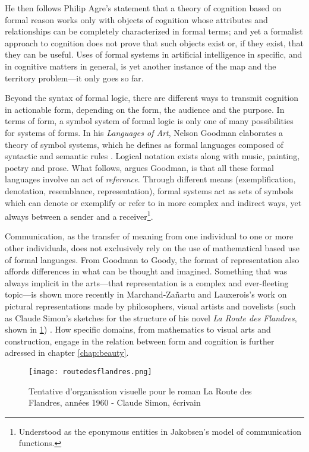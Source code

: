 He then follows Philip Agre's statement that a theory of cognition based on formal reason works only with objects of cognition whose attributes and relationships can be completely characterized in formal terms; and yet a formalist approach to cognition does not prove that such objects exist or, if they exist, that they can be useful. Uses of formal systems in artificial intelligence in specific, and in cognitive matters in general, is yet another instance of the map and the territory problem—it only goes so far.

Beyond the syntax of formal logic, there are different ways to transmit cognition in actionable form, depending on the form, the audience and the purpose. In terms of form, a symbol system of formal logic is only one of many possibilities for systems of forms. In his \emph{Languages of Art}, Nelson Goodman elaborates a theory of symbol systems, which he defines as formal languages composed of syntactic and semantic rules \citep{goodman_languages_1976}. Logical notation exists along with music, painting, poetry and prose. What follows, argues Goodman, is that all these formal languages involve an act of \emph{reference}. Through different means (exemplification, denotation, resemblance, representation), formal systems act as sets of symbols which can denote or exemplify or refer to in more complex and indirect ways, yet always between a sender and a receiver\footnote{Understood as the eponymous entities  in Jakobsen's model of communication functions.}.

Communication, as the transfer of meaning from one individual to one or more other individuals, does not exclusively rely on the use of mathematical based use of formal languages. From Goodman to Goody, the format of representation also affords differences in what can be thought and imagined. Something that was always implicit in the arts—that representation is a complex and ever-fleeting topic—is shown more recently in Marchand-Zañartu and Lauxerois's work on pictural representations made by philosophers, visual artists and novelists (such as Claude Simon's sketches for the structure of his novel \emph{La Route des Flandres}, shown in \ref{image:routedesflandres}) \citep{marchand-zanartu_32_2022}. How specific domains, from mathematics to visual arts and construction, engage in the relation between form and cognition is further adressed in chapter \ref{chap:beauty}.

\begin{figure}
    \begin{center}
        \texttt{[image: routedesflandres.png]}
        \caption{Tentative d'organisation visuelle pour le roman La Route des Flandres, années 1960 - Claude Simon, écrivain}
        \label{image:routedesflandres}
    \end{center}
\end{figure}

